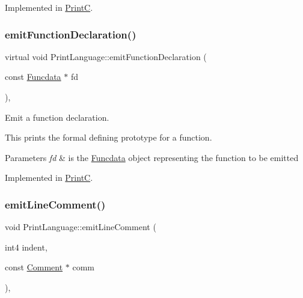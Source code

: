 Implemented in \mbox{\hyperlink{class_print_c_a23d8dc013a41698d5168665451b356f6}{PrintC}}.

\mbox{\label{class_print_language_a591f782041b30d6d0caf65dcbdd88c78}} 
\subsubsection{\texorpdfstring{emitFunctionDeclaration()}{emitFunctionDeclaration()}}
{\footnotesize\ttfamily virtual void Print\+Language\+::emit\+Function\+Declaration (\begin{DoxyParamCaption}\item[{const \mbox{\hyperlink{class_funcdata}{Funcdata}} $\ast$}]{fd }\end{DoxyParamCaption})\hspace{0.3cm}{\ttfamily [protected]}, {}}



Emit a function declaration. 

This prints the formal defining prototype for a function. 
\begin{DoxyParams}{Parameters}
{\em fd} & is the \mbox{\hyperlink{class_funcdata}{Funcdata}} object representing the function to be emitted \\
\hline
\end{DoxyParams}


Implemented in \mbox{\hyperlink{class_print_c_a38f45bf42a0b28ed731eb036636d0a11}{PrintC}}.

\mbox{\label{class_print_language_ae98ff6bbfded046b5177d9c6e728b99b}} 
\subsubsection{\texorpdfstring{emitLineComment()}{emitLineComment()}}
{\footnotesize\ttfamily void Print\+Language\+::emit\+Line\+Comment (\begin{DoxyParamCaption}\item[{int4}]{indent,  }\item[{const \mbox{\hyperlink{class_comment}{Comment}} $\ast$}]{comm }\end{DoxyParamCaption})\hspace{0.3cm}{\ttfamily [protected]}, {\ttfamily [virtual]}}




